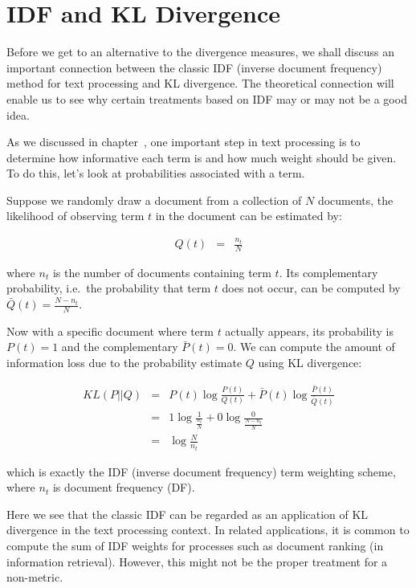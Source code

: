 \documentclass[
  letterpaper,
]{scrbook}
\begin{document}
\section{IDF and KL Divergence}\label{idf-and-kl-divergence}

Before we get to an alternative to the divergence measures, we shall
discuss an important connection between the classic IDF (inverse
document frequency) method for text processing and KL divergence. The
theoretical connection will enable us to see why certain treatments
based on IDF may or may not be a good idea.

As we discussed in chapter~, one important step in text processing is to
determine how informative each term is and how much weight should be
given. To do this, let's look at probabilities associated with a term.

Suppose we randomly draw a document from a collection of \(N\)
documents, the likelihood of observing term \(t\) in the document can be
estimated by:

\[\begin{aligned}
  Q(t) & = & \frac{n_t}{N}
\end{aligned}\]

where \(n_t\) is the number of documents containing term \(t\). Its
complementary probability, i.e.~the probability that term \(t\) does not
occur, can be computed by \(\bar{Q}(t) = \frac{N - n_t}{N}\).

Now with a specific document where term \(t\) actually appears, its
probability is \(P(t)=1\) and the complementary \(\bar{P}(t)=0\). We can
compute the amount of information loss due to the probability estimate
\(Q\) using KL divergence:

\[\begin{aligned}
  KL(P||Q)
  & = & P(t) \log \frac{P(t)}{Q(t)} + \bar{P}(t) \log \frac{\bar{P}(t)}{\bar{Q}(t)} \\
  & = & 1 \log \frac{1}{\frac{n_t}{N}} + 0 \log \frac{0}{\frac{N - n_t}{N}} \\
  & = & \log \frac{N}{n_t}
\end{aligned}\]

which is exactly the IDF (inverse document frequency) term weighting
scheme, where \(n_t\) is document frequency (DF).

Here we see that the classic IDF can be regarded as an application of KL
divergence in the text processing context. In related applications, it
is common to compute the sum of IDF weights for processes such as
document ranking (in information retrieval). However, this might not be
the proper treatment for a non-metric.
\end{document}
